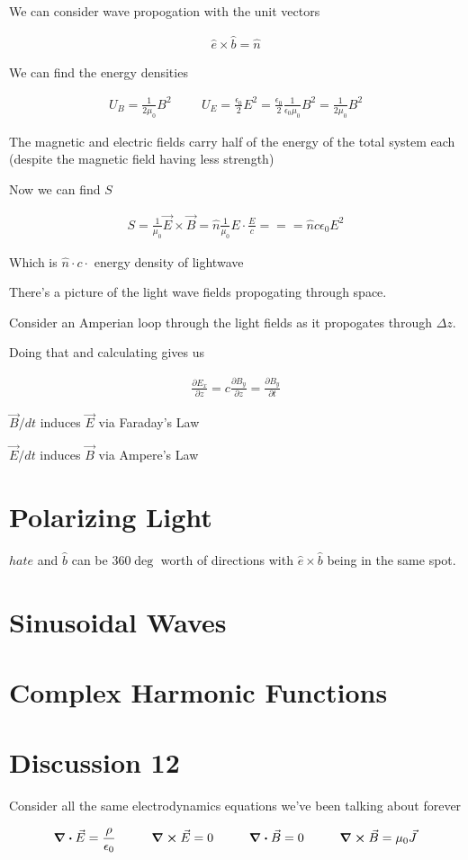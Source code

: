 \documentclass[fleqn]{report}
\newcommand{\hp}{\hspace{1cm}}
\newcommand{\del}{\partial}
\newcommand{\equations} [1] {
\begin{gather*}
#1
\end{gather*}
}
\begin{document}
We can consider wave propogation with the unit vectors 
\equations{
    \hat e 
    \times 
    \hat b 
    =
    \hat n
}

We can find the energy densities 
\equations{
    U_B 
    =
    \frac{1}{2 \mu_0} B^2
    \hp 
    U_E 
    =
    \frac{\epsilon_0}{2} E^2 
    =
    \frac{\epsilon_0}{2} \frac{1}{\epsilon_0 \mu_0} B^2 
    =
    \frac{1}{2 \mu_0} B^2
}
The magnetic and electric fields carry half of the energy of the total 
system each (despite the magnetic field having less strength)

Now we can find $S$
\equations{
    S 
    =
    \frac{1}{\mu_0} \vec E \times \vec B 
    =
    \hat n \frac{1}{\mu_0} E \cdot \frac{E}{c} 
    ===
    \hat n c \epsilon_0 E^2 
}

Which is $\hat n \cdot c \cdot$ energy density of lightwave

There's a picture of the light wave fields propogating through space. 

Consider an Amperian loop through the light fields as it propogates through 
$\Delta z$.

Doing that and calculating gives us 
\equations{
    \frac{\del E_x}{\del z}
    =
    c \frac{\del B_y}{\del z}
    =
    \frac{\del B_y}{\del t}
}
$\vec B / dt$ induces $\vec E$ via Faraday's Law 

$\vec E / dt$ induces $\vec B$ via Ampere's Law 

\section{Polarizing Light}
$hat e$ and $\hat b$ can be $360 \deg$ worth of directions with 
$\hat e \times \hat b$ being in the same spot. 

\section{Sinusoidal Waves}

\section{Complex Harmonic Functions}

\section{Discussion 12}
Consider all the same electrodynamics equations we've been talking about forever 
\equations{
    \div \vec E 
    = 
    \frac{\rho}{\epsilon_0}
    \hp 
    \curl \vec E 
    = 
    0 
    \hp 
    \div \vec B 
    = 
    0 
    \hp 
    \curl \vec B 
    = 
    \mu_0 \vec J 
}
\end{document}
